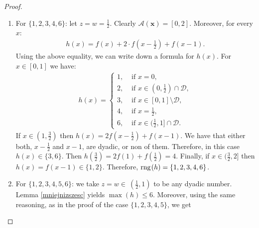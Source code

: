 \documentclass{amsart}
\theoremstyle{definition}
\newcommand{\rng}{{\rm rng} \hspace{0.03cm}}
\begin{document}
\begin{proof}
\begin{enumerate}
	\begin{align*}
	h(x)=f(x)+2\cdot f(x-z)+f(x-2z).
	\end{align*}
	At most on of the values $x$, $x-z$, $x-2z$, so
	\begin{align*}
	h(x)\leq \max\{2+2\cdot 1, 1 +2\cdot 2\}=5.
	\end{align*}
	It remains to show, that $h(x)$ can be equal to $3$, $4$ and $5$.
	\begin{itemize}
		\item $h(x)=3$ for $x=z$.
		\item $h(x)=4$ for $x=1-\frac{1}{2^{m}}$, where $m$ is any positive integer such that $z<1-\frac{1}{2^{m}}$,
		\item $h(x)=5$ for $x=z+\frac{1}{2^{m}}$, where $m$ is such that $z+\frac{1}{2^{m}} < 1$.
	\end{itemize}
	\item For $\{1,2,3,4,6\}$: let $z=w=\frac{1}{2}$. Clearly $\mathcal{A}(\mathbf{x})=[0,2]$. Moreover, for every $x$:
	\begin{align*}
		h(x) = f(x)+2\cdot f\left(x-\frac{1}{2}\right)+f(x-1).
	\end{align*}
	Using the above equality, we can write down a formula for $h(x)$. For $x\in[0,1]$ we have:
	\begin{align*}
	h(x) = \left\{
	\begin{array}{ll}
		1, & \textrm{ if } x=0, \\
		2, & \textrm{ if } x\in (0,\frac{1}{2})\cap \mathcal{D},\\
		3, & \textrm{ if } x\in [0,1]\setminus \mathcal{D},\\
		4, & \textrm{ if } x=\frac{1}{2},\\
		6, & \textrm{ if } x\in (\frac{1}{2},1]\cap\mathcal{D}.
	\end{array}	
	\right.
	\end{align*}
	If $x\in (1,\frac{3}{2})$ then $h(x)=2f\left(x-\frac{1}{2}\right) +f(x-1)$. We have that either both, $x-\frac{1}{2}$ and $x-1$, are dyadic, or non of them. Therefore, in this case $h(x)\in \{3,6\}$. Then $h\left(\frac{3}{2}\right)= 2f(1) + f\left(\frac{1}{2}\right) = 4$. Finally, if $x\in (\frac{3}{2},2]$ then $h(x) = f(x-1)\in\{1,2\}$. Therefore, $\rng (h) =\{1,2,3,4,6\}$.
	\item For $\{1,2,3,4,5,6\}$: we take $z=w\in\ (\frac{1}{2},1)$ to be any dyadic number. Lemma \ref{mniejnizszesc} yields $\max (h)\leq 6$. Moreover, using the same reasoning, as in the proof of the case $\{1,2,3,4,5\}$, we get
	\begin{itemize}

\end{itemize}
\end{enumerate}
\end{proof}
\end{document}
